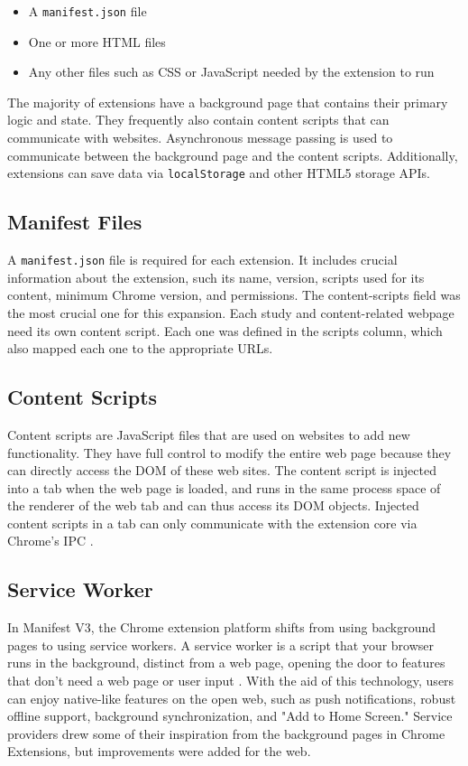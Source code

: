 \begin{itemize}
  \item A \texttt{manifest.json} file
  \item One or more HTML files
  \item Any other files such as CSS or JavaScript needed by the extension to run
\end{itemize}

The majority of extensions have a background page that contains their primary logic and state. They frequently also contain content scripts that can communicate with websites. Asynchronous message passing is used to communicate between the background page and the content scripts. Additionally, extensions can save data via \texttt{localStorage} and other HTML5 storage APIs.

\subsection{Manifest Files}
A \texttt{manifest.json} file is required for each extension. It includes crucial information about the extension, such its name, version, scripts used for its content, minimum Chrome version, and permissions. The content-scripts field was the most crucial one for this expansion. Each study and content-related webpage need its own content script. Each one was defined in the scripts column, which also mapped each one to the appropriate URLs.

\subsection{Content Scripts}
Content scripts are JavaScript files that are used on websites to add new functionality. They have full control to modify the entire web page because they can directly access the DOM of these web sites. The content script is injected into a tab when the web page is loaded, and runs in the same process space of the renderer of the web tab and can thus access its DOM objects. Injected content scripts in a tab can only communicate with the extension core via Chrome's IPC \autocite{liu2012chrome}.

\subsection{Service Worker}
\label{service_worker}
In Manifest V3, the Chrome extension platform shifts from using background pages to using service workers. A service worker is a script that your browser runs in the background, distinct from a web page, opening the door to features that don't need a web page or user input \autocite{chrome2021service}. With the aid of this technology, users can enjoy native-like features on the open web, such as push notifications, robust offline support, background synchronization, and "Add to Home Screen." Service providers drew some of their inspiration from the background pages in Chrome Extensions, but improvements were added for the web.

